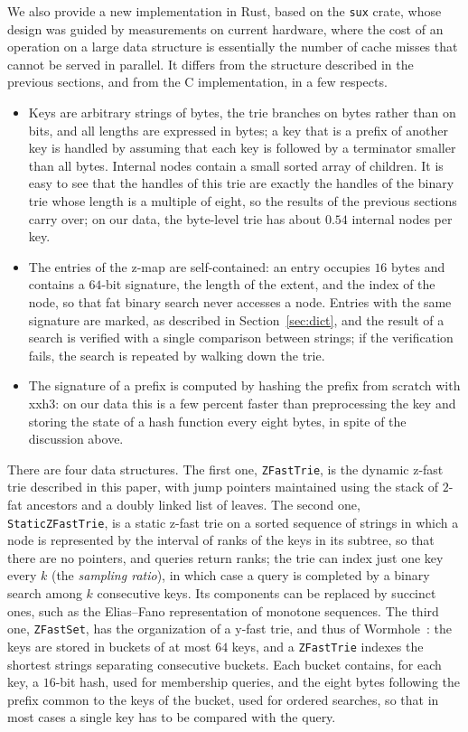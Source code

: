 \documentclass[a4paper]{article}
\newcommand{\?}{\mskip1.5mu}
\begin{document}
We also provide a new implementation in Rust, based on the \texttt{sux} crate, whose design 
was guided by measurements on current hardware, where the cost of an operation on a large data structure is essentially 
the number of cache misses that cannot be served in parallel. It differs from the structure described in the previous sections, 
and from the C implementation, in a few respects.
\begin{itemize}
\item Keys are arbitrary strings of bytes, the trie branches on bytes rather than on bits, and all lengths are expressed in bytes; 
a key that is a prefix of another key is handled by assuming that each key is followed by a terminator smaller than all bytes. 
Internal nodes contain a small sorted array of children. It is easy to see that the handles of this trie are exactly the handles
of the binary trie whose length is a multiple of eight, so the results of the previous sections carry over; on our data,
the byte-level trie has about $0.54$ internal nodes per key.
\item The entries of the z-map are self-contained: an entry occupies $16$ bytes and contains a $64$-bit signature, the length of the 
extent, and the index of the node, so that fat binary search never accesses a node. Entries with the same signature are marked, as described in
Section~\ref{sec:dict}, and the result of a search is verified with a single comparison between strings; if the verification fails,
the search is repeated by walking down the trie.
\item The signature of a prefix is computed by hashing the prefix from scratch with xxh3: on our data this is a few percent faster 
than preprocessing the key and storing the state of a hash function every eight bytes, in spite of the discussion above.
\end{itemize}

There are four data structures. The first one, \texttt{ZFastTrie}, is the dynamic z-fast trie described in this paper, with jump pointers 
maintained using the stack of $2$-fat ancestors and a doubly linked list of leaves. The second one, \texttt{StaticZFastTrie}, is a static z-fast trie on a sorted
sequence of strings in which a node is represented by the interval of ranks of the keys in its subtree, so that there are no pointers, 
and queries return ranks; the trie can index just one key every $k$ (the \emph{sampling ratio}), in which case a query is completed by 
a binary search among $k$ consecutive keys. Its components can be replaced by succinct ones, such as the Elias--Fano representation of 
monotone sequences. The third one, \texttt{ZFastSet}, has the organization of a y-fast trie, and thus of 
Wormhole~\cite{WNJWormhole}: the keys are stored in buckets of at most $64$ keys, and a \texttt{ZFastTrie} indexes the shortest strings separating consecutive buckets. 
Each bucket contains, for each key, a $16$-bit hash, used for membership queries, and the eight bytes following the prefix common to the keys of the bucket,
used for ordered searches, so that in most cases a single key has to be compared with the query. 
\end{document}
